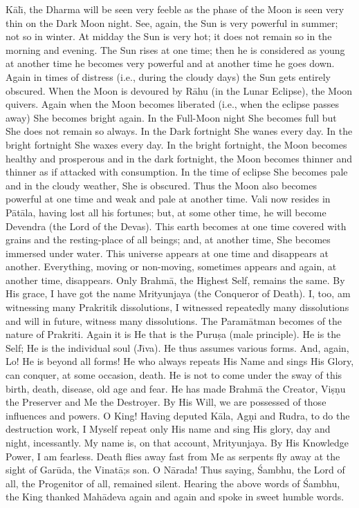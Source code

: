 K\=al\={\i}, the Dharma will be seen very feeble as the phase of the Moon is seen very thin on the Dark Moon night. See, again, the Sun is very powerful in summer; not so in winter. At midday the Sun is very hot; it does not remain so in the morning and evening. The Sun rises at one time; then he is considered as young at another time he becomes very powerful and at another time he goes down. Again in times of distress (i.e., during the cloudy days) the Sun gets entirely obscured. When the Moon is devoured by R\=ahu (in the Lunar Eclipse), the Moon quivers. Again when the Moon becomes liberated (i.e., when the eclipse passes away) She becomes bright again. In the Full-Moon night She becomes full but She does not remain so always. In the Dark fortnight She wanes every day. In the bright fortnight She waxes every day. In the bright fortnight, the Moon becomes healthy and prosperous and in the dark fortnight, the Moon becomes thinner and thinner as if attacked with consumption. In the time of eclipse She becomes pale and in the cloudy weather, She is obscured. Thus the Moon also becomes powerful at one time and weak and pale at another time. Vali now resides in P\=at\=ala, having lost all his fortunes; but, at some other time, he will become Devendra (the Lord of the Devas). This earth becomes at one time covered with grains and the resting-place of all beings; and, at another time, She becomes immersed under water. This universe appears at one time and disappears at another. Everything, moving or non-moving, sometimes appears and again, at another time, disappears. Only Brahm\=a, the Highest Self, remains the same. By His grace, I have got the name Mrityunjaya (the Conqueror of Death). I, too, am witnessing many Prakritik dissolutions, I witnessed repeatedly many dissolutions and will in future, witness many dissolutions. The Param\=atman becomes of the nature of Prakriti. Again it is He that is the Puru\d{s}a (male principle). He is the Self; He is the individual soul (J\={\i}va). He thus assumes various forms. And, again, Lo! He is beyond all forms! He who always repeats His Name and sings His Glory, can conquer, at some occasion, death. He is not to come under the sway of this birth, death, disease, old age and fear. He has made Brahm\=a the Creator, Vi\d{s}\d{n}u the Preserver and Me the Destroyer. By His Will, we are possessed of those influences and powers. O King! Having deputed K\=ala, Ag\d{n}i and Rudra, to do the destruction work, I Myself repeat only His name and sing His glory, day and night, incessantly. My name is, on that account, Mrityunjaya. By His Knowledge Power, I am fearless. Death flies away fast from Me as serpents fly away at the sight of Gar\=uda, the Vinat\=a;s son. O N\=arada! Thus saying, \'Sambhu, the Lord of all, the Progenitor of all, remained silent. Hearing the above words of \'Sambhu, the King thanked Mah\=adeva again and again and spoke in sweet humble words.

